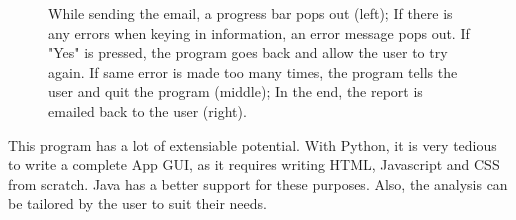 \documentclass[12pt]{article}
\begin{document}
\begin{figure}[htb]
\caption{While sending the email, a progress bar pops out (left);
If there is any errors when keying in information, an error message pops out. If "Yes" is pressed, the program goes back and allow the user to try again. If same error is made too many times, the program tells the user and quit the program (middle);
In the end, the report is emailed back to the user (right).}

\label{fig:pink_classifier}
\end{figure}


This program has a lot of extensiable potential. With Python, it is very tedious to write a complete App GUI, as it requires writing HTML, Javascript and CSS from scratch. Java has a better support for these purposes. Also, the analysis can be tailored by the user to suit their needs.
\end{document}
